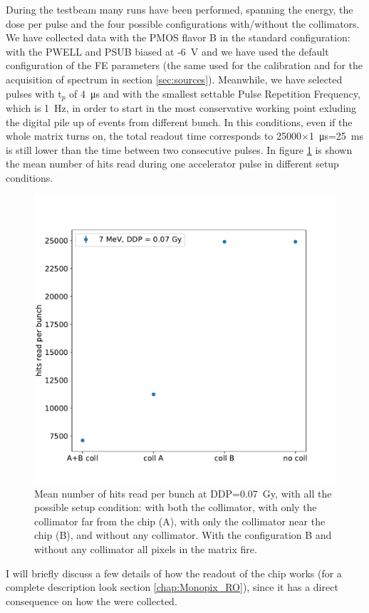    During the testbeam many runs have been performed, spanning the energy, the dose per pulse and the four possible configurations with/without the collimators. 
   We have collected data with the PMOS flavor B in the standard configuration: with the PWELL and PSUB biased at -\SI{6}{V} and we have used the default configuration of the FE parameters (the same used for the calibration and for the acquisition of spectrum in section \ref{sec:sources}).
   Meanwhile, we have selected pulses with t$_p$ of \SI{4}{\us} and with the smallest settable Pulse Repetition Frequency, which is \SI{1}{Hz}, in order to start in the most conservative working point exluding the digital pile up of events from different bunch. In this conditions, even if the whole matrix turns on, the total readout time corresponds to 25000$\times$\SI{1}{\us}=\SI{25}{ms} is still lower than the time between two consecutive pulses.
   In figure \ref{fig:hits_FLASH} is shown the mean number of hits read during one accelerator pulse in different setup conditions.
   \begin{figure}
      \centering
      \includegraphics[width=.49\linewidth]{figures/test_beam/hits.pdf}
      \caption{Mean number of hits read per bunch at DDP=\SI{0.07}{Gy}, with all the possible setup condition: with both the collimator, with only the collimator far from the chip (A), with only the collimator near the chip (B), and without any collimator. With the configuration B and without any collimator all pixels in the matrix fire.}
      \label{fig:hits_FLASH}
   \end{figure}

   
  I will briefly discuss a few details of how the readout of the chip works (for a complete description look section \ref{chap:Monopix_RO}), since it has a direct consequence on how the were collected. 

